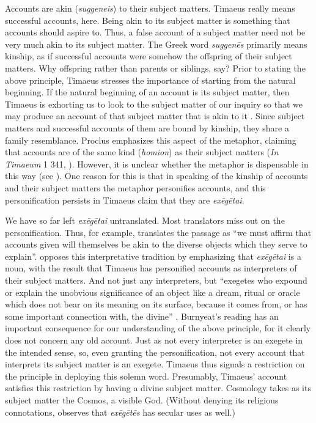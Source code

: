 Accounts are akin (\emph{suggeneis}) to their subject matters. Timaeus really means successful accounts, here. Being akin to its subject matter is something that accounts should aspire to. Thus, a false account of a subject matter need not be very much akin to its subject matter. The Greek word \emph{suggenēs} primarily means kinship, as if successful accounts were somehow the offspring of their subject matters. Why offspring rather than parents or siblings, say? Prior to stating the above principle, Timaeus stresses the importance of starting from the natural beginning. If the natural beginning of an account is its subject matter, then Timaeus is exhorting us to look to the subject matter of our inquiry so that we may produce an account of that subject matter that is akin to it \citep[120--1]{Bryan:2012bt}. Since subject matters and successful accounts of them are bound by kinship, they share a family resemblance. Proclus emphasizes this aspect of the metaphor, claiming that accounts are of the same kind (\emph{homion}) as their subject matters (\emph{In Timaeum} 1 341, \citealt{Diehl:1903re}). However, it is unclear whether the metaphor is dispensable in this way (see \citealt[122]{Bryan:2012bt}). One reason for this is that in speaking of the kinship of accounts and their subject matters the metaphor personifies accounts, and this personification persists in Timaeus claim that they are \emph{exēgētai}.

We have so far left \emph{exēgētai} untranslated. Most translators miss out on the personification. Thus, for example, \citet[53]{Bury:1929jb} translates the passage as ``we must affirm that accounts given will themselves be akin to the diverse objects which they serve to explain''. \citet[]{Burnyeat:2005it} opposes this interpretative tradition by emphasizing that \emph{exēgētai} is a noun, with the result that Timaeus has personified accounts as interpreters of their subject matters. And not just any interpreters, but ``exegetes who expound or explain the unobvious significance of an object like a dream, ritual or oracle which does not bear on its meaning on its surface, because it comes from, or has some important connection with, the divine'' \citep[149]{Burnyeat:2005it}. Burnyeat's reading has an important consequence for our understanding of the above principle, for it clearly does not concern any old account. Just as not every interpreter is an exegete in the intended sense, so, even granting the personification, not every account that interprets its subject matter is an exegete. Timaeus thus signals a restriction on the principle in deploying this solemn word. Presumably, Timaeus' account satisfies this restriction by having a divine subject matter. Cosmology takes as its subject matter the Cosmos, a visible God. (Without denying its religious connotations, \citealt[216--7]{Betegh:2010aa} observes that \emph{exēgētēs} has secular uses as well.) 

